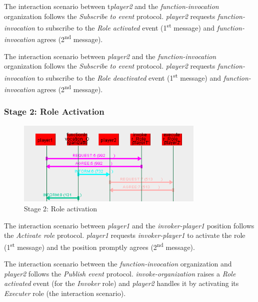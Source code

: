 The {} interaction scenario between t\textit{player2} and the \textit{function-invocation} organization follows the \textit{Subscribe to event} protocol.
\textit{player2} requests \textit{function-invocation} to subscribe to the \textit{Role activated} event (1\textsuperscript{st} message) and \textit{function-invocation} agrees (2\textsuperscript{nd} message).

The {} interaction scenario between \textit{player2} and the \textit{function-invocation} organization follows the \textit{Subscribe to event} protocol.
\textit{player2} requests \textit{function-invocation} to subscribe to the \textit{Role deactivated} event (1\textsuperscript{st} message) and \textit{function-invocation} agrees (2\textsuperscript{nd} message).

\subsubsection*{Stage 2: Role Activation}

\begin{figure}[H]
	\centering
	\includegraphics[width=0.8\textwidth]{images/examples/example1-stage2.png}
	\caption{Stage 2: Role activation}
	\label{figure:example1-stage2}
\end{figure}

The {} interaction scenario between \textit{player1} and the \textit{invoker-player1} position follows the \textit{Activate role} protocol.
\textit{player1} requests \textit{invoker-player1} to activate the role (1\textsuperscript{st} message) and the position promptly agrees (2\textsuperscript{nd} message).

The {} interaction scenario between the \textit{function-invocation} organization and \textit{player2} follows the \textit{Publish event} protocol.
\textit{invoke-organization} raises a \textit{Role activated} event (for the \textit{Invoker} role) and \textit{player2} handles it by activating its \textit{Executer} role (the {} interaction scenario).

